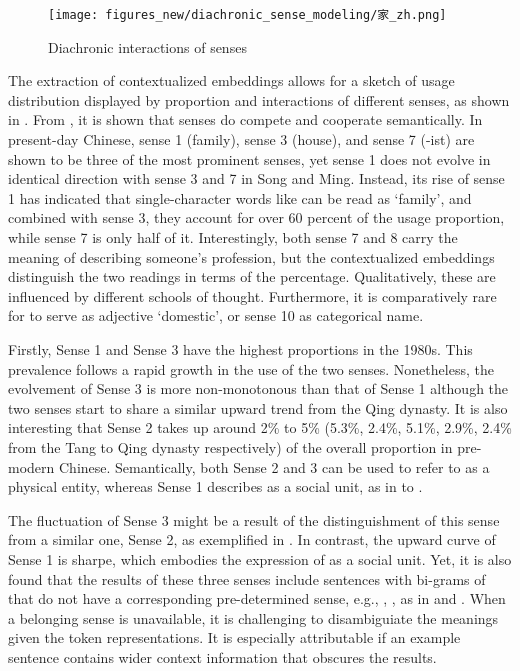 \begin{figure}[H]
  \centering
  \texttt{[image: figures\_new/diachronic\_sense\_modeling/家\_zh.png]}
  \caption{Diachronic interactions of senses}
  \label{fig:jia_polynomial}
\end{figure}

The extraction of contextualized embeddings allows for a sketch of usage distribution displayed by proportion and interactions of different senses, as shown in . From , it is shown that senses do compete and cooperate semantically. In present-day Chinese, sense 1 (family), sense 3 (house), and sense 7 (-ist) are shown to be three of the most prominent senses, yet sense 1 does not evolve in identical direction with sense 3 and 7 in Song and Ming. Instead, its rise of sense 1 has indicated that single-character words like \jia can be read as `family', and combined with sense 3, they account for over 60 percent of the usage proportion, while sense 7 is only half of it. Interestingly, both sense 7 and 8 carry the meaning of describing someone's profession, but the contextualized embeddings distinguish the two readings in terms of the percentage. Qualitatively, these are influenced by different schools of thought. Furthermore, it is comparatively rare for \jia to serve as adjective `domestic', or sense 10 as categorical name.

Firstly, Sense 1 and Sense 3 have the highest proportions in the 1980s. This prevalence follows a rapid growth in the use of the two senses. Nonetheless, the evolvement of Sense 3 is more non-monotonous than that of Sense 1 although the two senses start to share a similar upward trend from the Qing dynasty. It is also interesting that Sense 2 takes up around 2\% to 5\% (5.3\%, 2.4\%, 5.1\%, 2.9\%, 2.4\% from the Tang to Qing dynasty respectively) of the overall proportion in pre-modern Chinese. Semantically, both Sense 2 and 3 can be used to refer to \jia as a physical entity, whereas Sense 1 describes \jia as a social unit, as in  to . 

The fluctuation of Sense 3 might be a result of the distinguishment of this sense from a similar one, Sense 2, as exemplified in .  In contrast, the upward curve of Sense 1 is sharpe, which embodies the expression of \jia as a social unit. Yet, it is also found that the results of these three senses include sentences with bi-grams of \jia that do not have a corresponding pre-determined sense, e.g., , , as in  and . When a belonging sense is unavailable, it is challenging to disambiguiate the meanings given the token representations. It is especially attributable if an example sentence contains wider context information that obscures the results.

